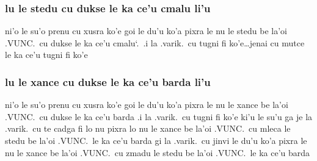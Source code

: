 \documentclass{report}
\newcommand\sds{\spacefactor\sfcode`.\ \space}
\begin{document}
\subsubsection{lu le stedu cu dukse le ka ce'u cmalu li'u}
ni'o le su'o prenu cu xusra ko'e goi le du'u ko'a pixra le nu le stedu be la'oi .VUNC.\ cu dukse le ka ce'u cmalu\sds  .i la .varik.\ cu tugni fi ko'e\ldots jenai cu mutce le ka ce'u tugni fi ko'e

\subsubsection{lu le xance cu dukse le ka ce'u barda li'u}
ni'o le su'o prenu cu xusra ko'e goi le du'u ko'a pixra le nu le xance be la'oi .VUNC.\ cu dukse le ka ce'u barda  .i la .varik.\ cu tugni fi ko'e ki'u le su'u ga je la .varik.\ cu te cadga fi lo nu pixra lo nu le xance be la'oi .VUNC.\ cu mleca le stedu be la'oi .VUNC.\ le ka ce'u barda gi la .varik.\ cu jinvi le du'u ko'a pixra le nu le xance be la'oi .VUNC.\ cu zmadu le stedu be la'oi .VUNC.\ le ka ce'u barda
\end{document}
